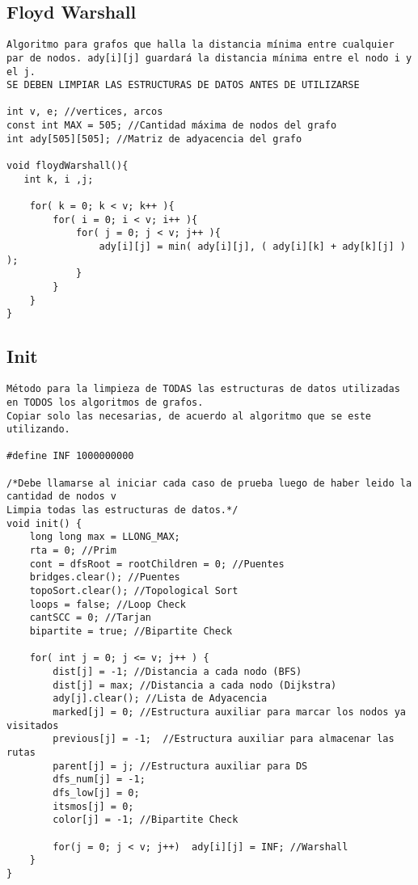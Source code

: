 \documentclass[10pt,letterpaper,twocolumn,twosided]{article}
\begin{document}
\subsection{Floyd Warshall}
\begin{lstlisting}
Algoritmo para grafos que halla la distancia mínima entre cualquier par de nodos. ady[i][j] guardará la distancia mínima entre el nodo i y el j.
SE DEBEN LIMPIAR LAS ESTRUCTURAS DE DATOS ANTES DE UTILIZARSE

int v, e; //vertices, arcos
const int MAX = 505; //Cantidad máxima de nodos del grafo
int ady[505][505]; //Matriz de adyacencia del grafo

void floydWarshall(){
   int k, i ,j;
    
    for( k = 0; k < v; k++ ){
        for( i = 0; i < v; i++ ){
            for( j = 0; j < v; j++ ){
                ady[i][j] = min( ady[i][j], ( ady[i][k] + ady[k][j] ) );
            }
        }
    }
}
\end{lstlisting}

\subsection{Init}
\begin{lstlisting}
Método para la limpieza de TODAS las estructuras de datos utilizadas en TODOS los algoritmos de grafos.
Copiar solo las necesarias, de acuerdo al algoritmo que se este utilizando.

#define INF 1000000000

/*Debe llamarse al iniciar cada caso de prueba luego de haber leido la cantidad de nodos v
Limpia todas las estructuras de datos.*/
void init() {
    long long max = LLONG_MAX;
    rta = 0; //Prim
    cont = dfsRoot = rootChildren = 0; //Puentes
    bridges.clear(); //Puentes
    topoSort.clear(); //Topological Sort
    loops = false; //Loop Check
    cantSCC = 0; //Tarjan
    bipartite = true; //Bipartite Check

    for( int j = 0; j <= v; j++ ) {
        dist[j] = -1; //Distancia a cada nodo (BFS)
        dist[j] = max; //Distancia a cada nodo (Dijkstra)
        ady[j].clear(); //Lista de Adyacencia
        marked[j] = 0; //Estructura auxiliar para marcar los nodos ya visitados
        previous[j] = -1;  //Estructura auxiliar para almacenar las rutas
        parent[j] = j; //Estructura auxiliar para DS
        dfs_num[j] = -1;
        dfs_low[j] = 0;
        itsmos[j] = 0;
        color[j] = -1; //Bipartite Check

        for(j = 0; j < v; j++)  ady[i][j] = INF; //Warshall
    }
}
\end{lstlisting}
\end{document}
